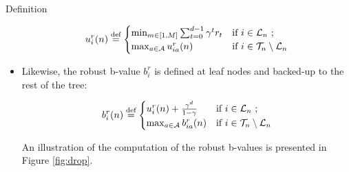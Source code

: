 \documentclass{article}
\newcommand{\eqdef}{\buildrel \text{def}\over =}
\begin{document}
\begin{paragraph}{Definition}
\begin{itemize}
\vspace{-4mm}
\begin{equation}
\label{eq:ur}
u_i^r(n) \eqdef
\begin{cases}
\min_{m\in[1, M]} \sum_{t=0}^{d-1} \gamma^t r_t &\text{if } i \in \mathcal{L}_n \text{ ;}\\
\max_{a\in\mathcal{A}} u_{ia}^r(n) & \text{if } i \in \mathcal{T}_n \setminus \mathcal{L}_n
\end{cases}
\end{equation}

\vspace{-1mm}
\item Likewise, the robust b-value $b_i^r$ is defined at leaf nodes and backed-up to the rest of the tree:

\vspace{-4mm}
\begin{equation}
\label{eq:br}
b_i^r(n) \eqdef
\begin{cases}
u_i^r(n) + \frac{\gamma^d}{1-\gamma} &\text{if } i \in \mathcal{L}_n \text{ ;}\\
\max_{a\in\mathcal{A}} b_{ia}^r(n) & \text{if } i \in \mathcal{T}_n \setminus \mathcal{L}_n 
\end{cases}
\end{equation}

\vspace{-2.5mm}\noindent
An illustration of the computation of the robust b-values is presented in Figure \ref{fig:drop}.


\end{itemize}
\end{paragraph}
\end{document}

